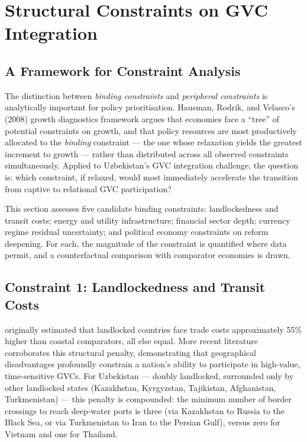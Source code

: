 \section{Structural Constraints on GVC Integration}
\label{sec:constraints}

\subsection{A Framework for Constraint Analysis}

The distinction between \textit{binding constraints} and \textit{peripheral constraints} is analytically important for policy prioritisation. Hausman, Rodrik, and Velasco's (2008) growth diagnostics framework argues that economies face a ``tree'' of potential constraints on growth, and that policy resources are most productively allocated to the \textit{binding} constraint --- the one whose relaxation yields the greatest increment to growth --- rather than distributed across all observed constraints simultaneously. Applied to Uzbekistan's GVC integration challenge, the question is: which constraint, if relaxed, would most immediately accelerate the transition from captive to relational GVC participation?

This section assesses five candidate binding constraints: landlockedness and transit costs; energy and utility infrastructure; financial sector depth; currency regime residual uncertainty; and political economy constraints on reform deepening. For each, the magnitude of the constraint is quantified where data permit, and a counterfactual comparison with comparator economies is drawn.

\subsection{Constraint 1: Landlockedness and Transit Costs}

\citet{limao2001} originally estimated that landlocked countries face trade costs approximately 55\% higher than coastal comparators, all else equal. More recent literature corroborates this structural penalty, demonstrating that geographical disadvantages profoundly constrain a nation's ability to participate in high-value, time-sensitive GVCs. For Uzbekistan --- doubly landlocked, surrounded only by other landlocked states (Kazakhstan, Kyrgyzstan, Tajikistan, Afghanistan, Turkmenistan) --- this penalty is compounded: the minimum number of border crossings to reach deep-water ports is three (via Kazakhstan to Russia to the Black Sea, or via Turkmenistan to Iran to the Persian Gulf), versus zero for Vietnam and one for Thailand.

